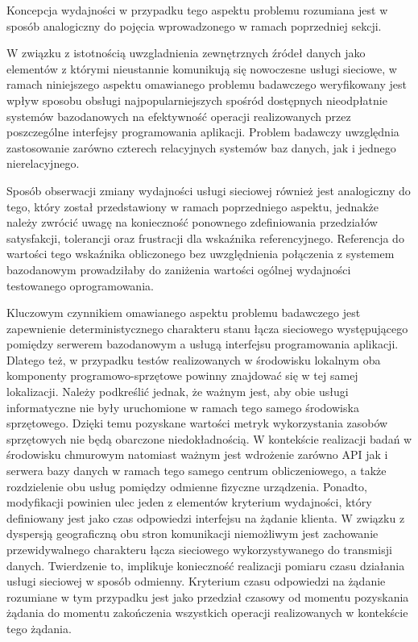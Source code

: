 Koncepcja wydajności w przypadku tego aspektu problemu rozumiana jest w sposób analogiczny do pojęcia wprowadzonego w ramach poprzedniej sekcji.

W związku z istotnością uwzgladnienia zewnętrznych źródeł danych jako elementów z którymi nieustannie komunikują się nowoczesne usługi sieciowe, w ramach niniejszego aspektu omawianego problemu badawczego weryfikowany jest wpływ sposobu obsługi najpopularniejszych spośród dostępnych nieodpłatnie systemów bazodanowych na efektywność operacji realizowanych przez poszczególne interfejsy programowania aplikacji. Problem badawczy uwzględnia zastosowanie zarówno czterech relacyjnych systemów baz danych, jak i jednego nierelacyjnego. 

Sposób obserwacji zmiany wydajności usługi sieciowej również jest analogiczny do tego, który został przedstawiony w ramach poprzedniego aspektu, jednakże należy zwrócić uwagę na konieczność ponownego zdefiniowania przedziałów satysfakcji, tolerancji oraz frustracji dla wskaźnika referencyjnego. Referencja do wartości tego wskaźnika obliczonego bez uwzględnienia połączenia z systemem bazodanowym prowadziłaby do zaniżenia wartości ogólnej wydajności testowanego oprogramowania.

Kluczowym czynnikiem omawianego aspektu problemu badawczego jest zapewnienie deterministycznego charakteru stanu łącza sieciowego występującego pomiędzy serwerem bazodanowym a usługą interfejsu programowania aplikacji. Dlatego też, w przypadku testów realizowanych w środowisku lokalnym oba komponenty programowo-sprzętowe powinny znajdować się w tej samej lokalizacji. Należy podkreślić jednak, że ważnym jest, aby obie usługi informatyczne nie były uruchomione w ramach tego samego środowiska sprzętowego. Dzięki temu pozyskane wartości metryk wykorzystania zasobów sprzętowych nie będą obarczone niedokładnością. W kontekście realizacji badań w środowisku chmurowym natomiast ważnym jest wdrożenie zarówno API jak i serwera bazy danych w ramach tego samego centrum obliczeniowego, a także rozdzielenie obu usług pomiędzy odmienne fizyczne urządzenia. Ponadto, modyfikacji powinien ulec jeden z elementów kryterium wydajności, który definiowany jest jako czas odpowiedzi interfejsu na żądanie klienta. W związku z dyspersją geograficzną obu stron komunikacji niemożliwym jest zachowanie przewidywalnego charakteru łącza sieciowego wykorzystywanego do transmisji danych. Twierdzenie to, implikuje konieczność realizacji pomiaru czasu działania usługi sieciowej w sposób odmienny. Kryterium czasu odpowiedzi na żądanie rozumiane w tym przypadku jest jako przedział czasowy od momentu pozyskania żądania do momentu zakończenia wszystkich operacji realizowanych w kontekście tego żądania. 
